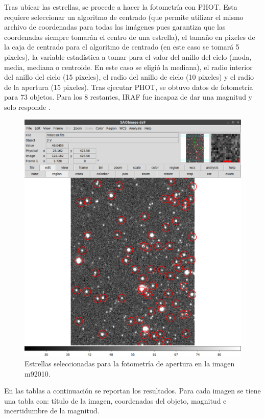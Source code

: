 \documentclass[12pt]{article}
\begin{document}
Tras ubicar las estrellas, se procede a hacer la fotometría con PHOT.
Esta requiere seleccionar un algoritmo de centrado (que permite utilizar el mismo archivo de coordenadas para todas las imágenes pues garantiza que las coordenadas siempre tomarán el centro de una estrella), el tamaño en pixeles de la caja de centrado para el algoritmo de centrado (en este caso se tomará 5 pixeles), la variable estadística a tomar para el valor del anillo del cielo (moda, media, mediana o centroide. En este caso se eligió la mediana), el radio interior del anillo del cielo (15 pixeles), el radio del anillo de cielo (10 pixeles) y el radio de la apertura (15 pixeles). 
Tras ejecutar PHOT, se obtuvo datos de fotometría para 73 objetos. Para los 8 restantes, IRAF fue incapaz de dar una magnitud y solo responde .


\begin{figure}[H]
   \includegraphics[scale=0.4]{im01.png}
  \caption{Estrellas seleccionadas para la fotometría de apertura en la imagen m92010.}
  \label{im1}
\end{figure}


En las tablas a continuación se reportan los resultados. Para cada imagen se tiene una tabla con: título de la imagen, coordenadas del objeto, magnitud e incertidumbre de la magnitud.









%
\end{document}
